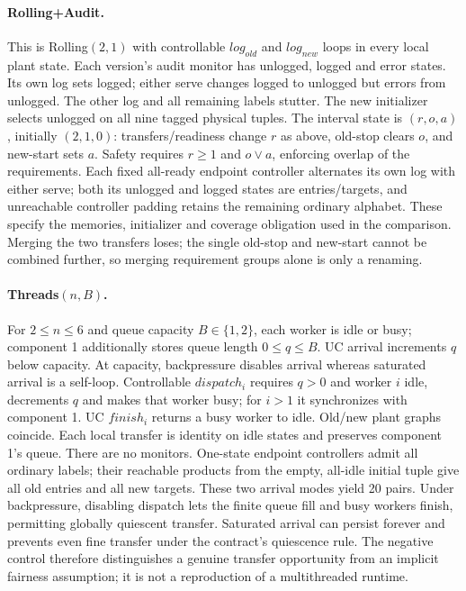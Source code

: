 \paragraph{Rolling+Audit.}
This is Rolling$(2,1)$ with controllable $log_{old}$ and $log_{new}$ loops in every local plant state. Each version's audit monitor has unlogged, logged and error states. Its own log sets logged; either serve changes logged to unlogged but errors from unlogged. The other log and all remaining labels stutter. The new initializer selects unlogged on all nine tagged physical tuples. The interval state is $(r,o,a)$, initially $(2,1,0)$: transfers/readiness change $r$ as above, old-stop clears $o$, and new-start sets $a$. Safety requires $r\geq1$ and $o\lor a$, enforcing overlap of the requirements. Each fixed all-ready endpoint controller alternates its own log with either serve; both its unlogged and logged states are entries/targets, and unreachable controller padding retains the remaining ordinary alphabet. These specify the memories, initializer and coverage obligation used in the comparison. Merging the two transfers loses; the single old-stop and new-start cannot be combined further, so merging requirement groups alone is only a renaming.

\paragraph{Threads$(n,B)$.}
For $2\leq n\leq6$ and queue capacity $B\in\{1,2\}$, each worker is idle or busy; component 1 additionally stores queue length $0\leq q\leq B$. UC arrival increments $q$ below capacity. At capacity, backpressure disables arrival whereas saturated arrival is a self-loop. Controllable $dispatch_i$ requires $q>0$ and worker $i$ idle, decrements $q$ and makes that worker busy; for $i>1$ it synchronizes with component 1. UC $finish_i$ returns a busy worker to idle. Old/new plant graphs coincide. Each local transfer is identity on idle states and preserves component 1's queue. There are no monitors. One-state endpoint controllers admit all ordinary labels; their reachable products from the empty, all-idle initial tuple give all old entries and all new targets. These two arrival modes yield 20 pairs. Under backpressure, disabling dispatch lets the finite queue fill and busy workers finish, permitting globally quiescent transfer. Saturated arrival can persist forever and prevents even fine transfer under the contract's quiescence rule. The negative control therefore distinguishes a genuine transfer opportunity from an implicit fairness assumption; it is not a reproduction of a multithreaded runtime.


